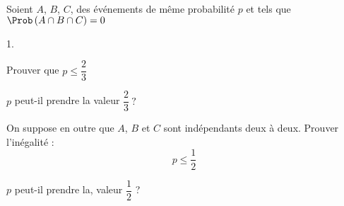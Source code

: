 \documentclass[11pt]{article}%
\begin{document}
\begin{exerciceSP}~\\
  Soient $A$, $B$, $C$, des événements de même probabilité $p$ et tels
  que $\Prob\left( A\cap B\cap C\right) =0$

  \begin{noliste}{1.}
    \setlength{\itemsep}{2mm}
  \item Prouver que $p\leq \dfrac{2}{3}$

  \item $p$ peut-il prendre la valeur $\dfrac{2}{3}\ ?$

  \item On suppose en outre que $A$, $B$ et $C$ sont indépendants deux 
    à deux. Prouver l'inégalité :%
    \begin{equation*}
      p\leq \frac{1}{2}
    \end{equation*}

  \item $p$ peut-il prendre la, valeur $\dfrac{1}{2}$ ?
  \end{noliste}
\end{exerciceSP}

\end{document}
